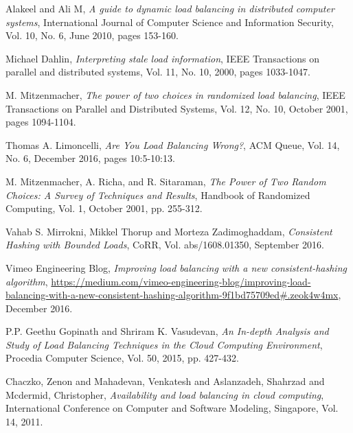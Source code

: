 \begin{thebibliography}{1}

Alakeel and Ali M, \emph{A guide to dynamic load balancing in distributed
  computer systems}, International Journal of Computer Science and Information
  Security, Vol. 10, No. 6, June 2010, pages 153-160.

Michael Dahlin, \emph{Interpreting stale load information},
  IEEE Transactions on parallel and distributed systems,
  Vol. 11, No. 10, 2000, pages 1033-1047.

M. Mitzenmacher, \emph{The power of two choices in randomized load balancing},
  IEEE Transactions on Parallel and Distributed Systems,
  Vol. 12, No. 10, October 2001, pages 1094-1104.

  Thomas A. Limoncelli, \emph{Are You Load Balancing Wrong?},
  ACM Queue,
  Vol. 14, No. 6, December 2016, pages 10:5-10:13.

M. Mitzenmacher, A. Richa, and R. Sitaraman,
  \emph{The Power of Two Random Choices: A Survey of Techniques and Results},
  Handbook of Randomized Computing,
  Vol. 1, October 2001, pp. 255-312.

Vahab S. Mirrokni, Mikkel Thorup and Morteza Zadimoghaddam,
  \emph{Consistent Hashing with Bounded Loads},
  CoRR,
  Vol. abs/1608.01350, September 2016.

Vimeo Engineering Blog, \emph{Improving load balancing with a new consistent-hashing algorithm},
  \url{https://medium.com/vimeo-engineering-blog/improving-load-balancing-with-a-new-consistent-hashing-algorithm-9f1bd75709ed#.zeok4w4mx},
  December 2016.

  P.P. Geethu Gopinath and Shriram K. Vasudevan, \emph{An In-depth Analysis and Study of Load Balancing Techniques in the Cloud Computing Environment},
  Procedia Computer Science,
  Vol. 50, 2015, pp. 427-432.

  Chaczko, Zenon and Mahadevan, Venkatesh and Aslanzadeh, Shahrzad and Mcdermid,
  Christopher,
  \emph{Availability and load balancing in cloud computing},
  International Conference on Computer and Software Modeling, Singapore,
  Vol. 14, 2011.

\end{thebibliography}
